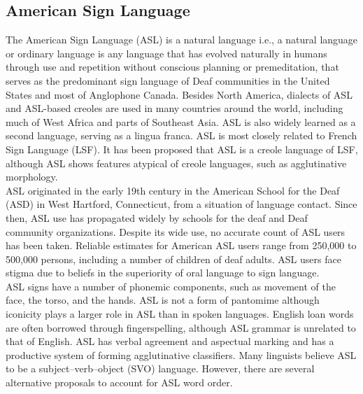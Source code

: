 \documentclass[14pt]{report}
\begin{document}
			\subsection{American Sign Language}
				The American Sign Language (ASL) is a natural language i.e., a natural language or ordinary language is any language that has evolved naturally in humans through use and repetition without conscious planning or premeditation, that serves as the predominant sign language of Deaf communities in the United States and most of Anglophone Canada. Besides North America, dialects of ASL and ASL-based creoles are used in many countries around the world, including much of West Africa and parts of Southeast Asia. ASL is also widely learned as a second language, serving as a lingua franca. ASL is most closely related to French Sign Language (LSF). It has been proposed that ASL is a creole language of LSF, although ASL shows features atypical of creole languages, such as agglutinative morphology.\\

				ASL originated in the early 19th century in the American School for the Deaf (ASD) in West Hartford, Connecticut, from a situation of language contact. Since then, ASL use has propagated widely by schools for the deaf and Deaf community organizations. Despite its wide use, no accurate count of ASL users has been taken. Reliable estimates for American ASL users range from 250,000 to 500,000 persons, including a number of children of deaf adults. ASL users face stigma due to beliefs in the superiority of oral language to sign language.\\

				ASL signs have a number of phonemic components, such as movement of the face, the torso, and the hands. ASL is not a form of pantomime although iconicity plays a larger role in ASL than in spoken languages. English loan words are often borrowed through fingerspelling, although ASL grammar is unrelated to that of English. ASL has verbal agreement and aspectual marking and has a productive system of forming agglutinative classifiers. Many linguists believe ASL to be a subject–verb–object (SVO) language. However, there are several alternative proposals to account for ASL word order.
			
\end{document}
